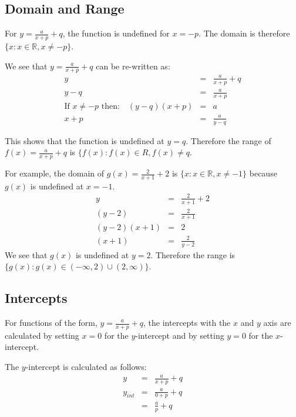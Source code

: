 \subsection{Domain and Range}
For $y=\frac{a}{x+p} + q$, the function is undefined for $x=-p$. The domain is therefore $\{x:x\in\mathbb{R},x\ne -p\}$.

We see that $y=\frac{a}{x+p} + q$ can be re-written as:
\begin{eqnarray*}
y&=&\frac{a}{x+p} + q\\
y-q&=&\frac{a}{x+p}\\
\mbox{If $x\ne -p$ then:}\quad (y-q)(x+p)&=&a\\
x+p&=&\frac{a}{y-q}
\end{eqnarray*}

This shows that the function is undefined at $y=q$. Therefore the range of $f(x)=\frac{a}{x+p} + q$ is $\{f(x):f(x)\in R, f(x) \neq q$.

For example, the domain of $g(x)=\frac{2}{x+1} + 2$ is $\{x:x\in\mathbb{R}, x\ne-1\}$ because $g(x)$ is undefined at $x=-1$.
\begin{eqnarray*}
y&=&\frac{2}{x+1} + 2\\
(y-2)&=&\frac{2}{x+1}\\
(y-2)(x+1)&=& 2\\
(x+1)&=&\frac{2}{y-2}
\end{eqnarray*}
We see that $g(x)$ is undefined at $y=2$. Therefore the range is $\{g(x):g(x)\in(-\infty,2)\cup(2,\infty)\}$.


\subsection{Intercepts}
For functions of the form, $y=\frac{a}{x+p} + q$, the intercepts with the $x$ and $y$ axis are calculated by setting $x=0$ for the $y$-intercept and by setting $y=0$ for the $x$-intercept.

The $y$-intercept is calculated as follows:
\begin{eqnarray}
y&=&\frac{a}{x+p} + q\\
y_{int}&=&\frac{a}{0+p} + q\\
&=&\frac{a}{p} + q
\end{eqnarray}


